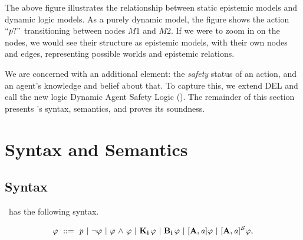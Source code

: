\begin {center}
\end{center}

The above figure illustrates the relationship between static epistemic models and dynamic logic models. As a purely dynamic model, the figure shows the action $``p?"$ transitioning between nodes $M1$ and $M2$. If we were to zoom in on the nodes, we would see their structure as epistemic models, with their own nodes and edges, representing possible worlds and epistemic relations.

We are concerned with an additional element: the \emph{safety} status of an action, and an agent's knowledge and belief about that. To capture this, we extend DEL and call the new logic Dynamic Agent Safety Logic (\DASL). The remainder of this section presents \DASL's syntax, semantics, and proves its soundness. 
\section{Syntax and Semantics}
\subsection{Syntax}
\DASL\  has the following syntax.

	$$ \varphi \ ::=\   \mathit{p}  \ |\  {\neg} \varphi \ |\  \varphi {\ \wedge \ } \varphi  \ |\  \mathbf{K}_{\mathbf{i}}\, \varphi \ |\  \mathbf{B}_{\mathbf{i}}\,\varphi \ |\  \mathbf{[A,\mathit{a}]}\varphi \ |\ \mathbf{[A,\mathit{a}]^\mathcal{S}}\varphi,$$

